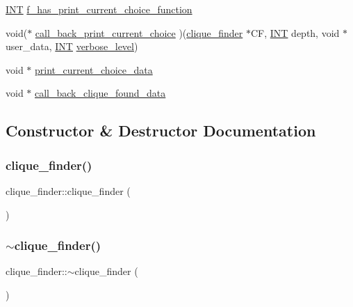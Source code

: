 \begin{DoxyCompactItemize}
\item 
\mbox{\hyperlink{galois_8h_a09fddde158a3a20bd2dcadb609de11dc}{I\+NT}} \mbox{\hyperlink{classclique__finder_af25268b973ddd454ef129fd323466472}{f\+\_\+has\+\_\+print\+\_\+current\+\_\+choice\+\_\+function}}
\item 
void($\ast$ \mbox{\hyperlink{classclique__finder_a7409a68b80a3532663eaf98ea0019955}{call\+\_\+back\+\_\+print\+\_\+current\+\_\+choice}} )(\mbox{\hyperlink{classclique__finder}{clique\+\_\+finder}} $\ast$CF, \mbox{\hyperlink{galois_8h_a09fddde158a3a20bd2dcadb609de11dc}{I\+NT}} depth, void $\ast$user\+\_\+data, \mbox{\hyperlink{galois_8h_a09fddde158a3a20bd2dcadb609de11dc}{I\+NT}} \mbox{\hyperlink{classclique__finder_a0039c6c78005df91c2f78efdc1c8156f}{verbose\+\_\+level}})
\item 
void $\ast$ \mbox{\hyperlink{classclique__finder_a9935ff3ae5402e411e692dde6e52e0fa}{print\+\_\+current\+\_\+choice\+\_\+data}}
\item 
void $\ast$ \mbox{\hyperlink{classclique__finder_a9fe6744d4265e759432790613ef16ce9}{call\+\_\+back\+\_\+clique\+\_\+found\+\_\+data}}
\end{DoxyCompactItemize}


\subsection{Constructor \& Destructor Documentation}
\mbox{\label{classclique__finder_a996255a587a5338e5214d54a6d63b95a}} 
\subsubsection{\texorpdfstring{clique\+\_\+finder()}{clique\_finder()}}
{\footnotesize\ttfamily clique\+\_\+finder\+::clique\+\_\+finder (\begin{DoxyParamCaption}{ }\end{DoxyParamCaption})}

\mbox{\label{classclique__finder_a5a64ff27a69e4dcaba50818135adcc3a}} 
\subsubsection{\texorpdfstring{$\sim$clique\+\_\+finder()}{~clique\_finder()}}
{\footnotesize\ttfamily clique\+\_\+finder\+::$\sim$clique\+\_\+finder (\begin{DoxyParamCaption}{ }\end{DoxyParamCaption})}



